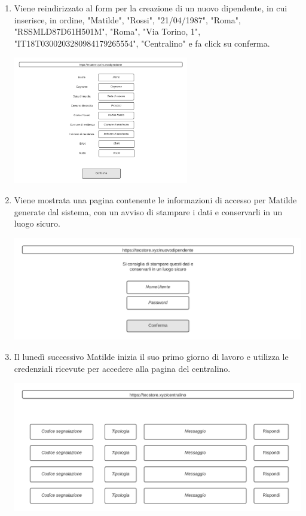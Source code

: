 \documentclass[12pt,a4paper]{article}
\begin{document}
\begin{enumerate}
\item Viene reindirizzato al form per la creazione di un nuovo dipendente, in cui inserisce, in ordine, "Matilde", "Rossi", "21/04/1987", "Roma", "RSSMLD87D61H501M", "Roma", "Via Torino, 1", "IT18T0300203280984179265554", "Centralino" e fa click su conferma.

\includegraphics[height=210px]{nuovodipendente}

\item Viene mostrata una pagina contenente le informazioni di accesso per Matilde generate dal sistema, con un avviso di stampare i dati e conservarli in un luogo sicuro.

\includegraphics[width=\textwidth]{nuovodipendente2}

\item Il lunedì successivo Matilde inizia il suo primo giorno di lavoro e utilizza le credenziali ricevute per accedere alla pagina del centralino.

\includegraphics[width=\textwidth]{centralino}

\end{enumerate}
\end{document}

